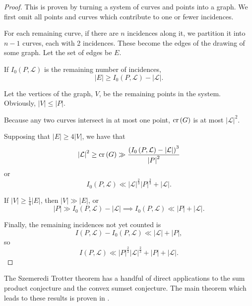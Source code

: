 \documentclass[12pt,reqno]{amsart}
\begin{document}
\begin{proof}
This is proven by turning a system of curves and points into a graph. We first omit all points and curves which
contribute to one or fewer incidences. 

For each remaining curve, if there are \(n\) incidences
along it, we partition it into \(n-1\) curves, each with 2 incidences. These become
the edges of the drawing of some graph. Let the set of edges be \(E\).

If \(I_0(P , \mathcal{L} )\) is the remaining number of incidences,
\[
    \left\lvert E \right\rvert \geq  I_0(P , \mathcal{L} ) - \left\lvert \mathcal{L}  \right\rvert 
.\]

Let the vertices of the graph, \(V\), be the remaining points in the system. Obviously, \(\left\lvert V \right\rvert \leq \left\lvert P \right\rvert \).

Because any two curves intersect in at most one point, \(\operatorname{cr}\left( G \right) \) is at most
\(\left\lvert \mathcal{L}  \right\rvert ^{2}\).

Supposing that \(\left\lvert E \right\rvert \geq 4 \left\lvert V \right\rvert \), we have that
\[
    \left\lvert \mathcal{L}  \right\rvert ^{2} \geq \operatorname{cr}\left( G \right) \gg \frac{\left( I_0 \left( P, \mathcal{L}  \right) - \left\lvert \mathcal{L}  \right\rvert \right)  ^{3}  }{\left\lvert P \right\rvert ^{2}} 
\]
or
\[
    I_0(P , \mathcal{L} ) \ll \left\lvert \mathcal{L}  \right\rvert ^{\frac{2}{3} } \left\lvert P \right\rvert ^{\frac{2}{3} } + \left\lvert \mathcal{L}  \right\rvert 
.\]

If \(\left\lvert V \right\rvert \geq \frac{1}{4} \left\lvert E \right\rvert \), then \(\left\lvert V \right\rvert  \gg \left\lvert E \right\rvert \), or
\[
    \left\lvert P \right\rvert \gg I_0\left( P , \mathcal{L}  \right) - \left\lvert \mathcal{L}  \right\rvert \implies I_0(P,\mathcal{L} ) \ll \left\lvert P \right\rvert  + \left\lvert \mathcal{L}  \right\rvert  
.\]

Finally, the remaining incidences not yet counted is 
\[
    I(P, \mathcal{L} ) - I_0 (P , \mathcal{L} ) \ll \left\lvert \mathcal{L} \right\rvert + \left\lvert P \right\rvert
,\]
so
\[
    I(P, \mathcal{L} ) \ll \left\lvert P \right\rvert ^{\frac{2}{3} }\left\lvert \mathcal{L}  \right\rvert ^{\frac{2}{3} } + \left\lvert P \right\rvert + \left\lvert \mathcal{L}  \right\rvert 
.\]
\end{proof}

The Szemeredi Trotter theorem has a handful of direct applications to the sum
product conjecture and the convex sumset conjecture. The main theorem which leads
to these results is proven in \cite{elekes}.
\end{document}

